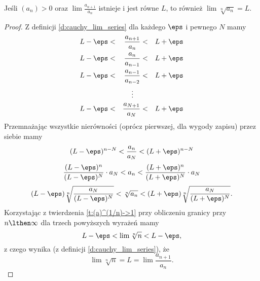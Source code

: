 \documentclass[11pt]{scrartcl}
\begin{document}
    \begin{theorem}
        \label{t:lim an/a_n+1 = lim a_n^(1/n)}
        Jeśli $(a_n) > 0$ oraz $\lim\frac{a_{n+1}}{a_n}$ istnieje i jest równe $L$, to również $\lim \sqrt[n]{a_n} = L$.
    \end{theorem}
    \begin{proof}
        Z definicji \ref{d:cauchy_lim_series} dla każdego $\eps$ i pewnego $N$ mamy
        $$\begin{aligned}
            L - \eps &<& \frac{a_{n+1}}{a_n} &<& L + \eps \\
            L - \eps &<& \frac{a_n}{a_{n-1}} &<& L + \eps \\
            L - \eps &<& \frac{a_{n-1}}{a_{n-2}} &<& L + \eps \\
                     & & \vdots\quad  \\
            L - \eps &<& \frac{a_{N+1}}{a_N} &<& L + \eps \\
        \end{aligned}$$
        Przemnażając wszystkie nierówności (oprócz pierwszej, dla wygody zapisu) przez siebie mamy
        \[ (L - \eps)^{n-N} < \frac{a_n}{a_N} < (L + \eps)^{n-N} \]
        \[ \frac{(L - \eps)^n}{(L - \eps)^{N}} \cdot a_N < a_n < \frac{(L + \eps)^n}{(L + \eps)^{N}} \cdot a_N \]
        \[ (L - \eps)\sqrt[n]{\frac{a_N}{(L - \eps)^{N}}} < \sqrt[n]{a_n} < (L + \eps)\sqrt[n]{\frac{a_N}{(L + \eps)^{N}}}. \]
        Korzystając z twierdzenia \ref{t:(a)^(1/n)->1} przy obliczeniu granicy przy $n \lthen \infty$ dla trzech powyższych wyrażeń mamy
        \[ L - \eps < \lim\sqrt[n]{n} < L - \eps, \]
        z czego wynika (z definicji \ref{d:cauchy_lim_series}), że
        \[ \lim\sqrt[n]{n} = L = \lim\frac{a_{n+1}}{a_n}. \]
    \end{proof}
\end{document}
